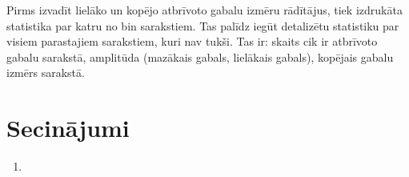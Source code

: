 Pirms izvadīt lielāko un kopējo atbrīvoto gabalu izmēru rādītājus, tiek izdrukāta statistika par katru no bin sarakstiem.
Tas palīdz iegūt detalizētu statistiku par visiem parastajiem sarakstiem, kuri nav tukši.
Tas ir: skaits cik ir atbrīvoto gabalu sarakstā, amplitūda (mazākais gabals, lielākais gabals), kopējais gabalu izmērs sarakstā.


\section{Secinājumi}
\begin{enumerate}
\item
\end{enumerate}


